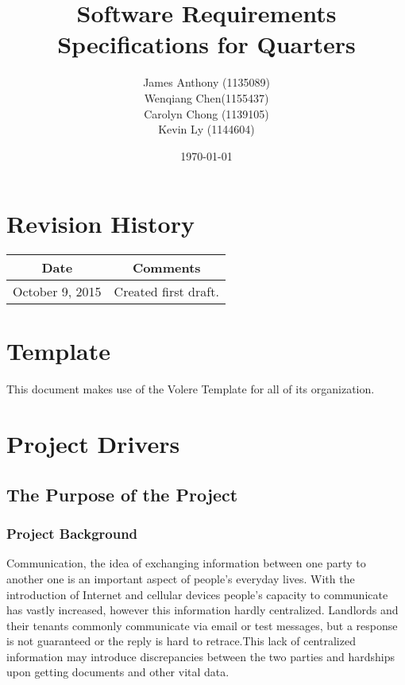\documentclass[12pt, titlepage]{article}
\begin{document}
\title{Software Requirements Specifications for Quarters} 
\author{James Anthony (1135089)\\ Wenqiang Chen(1155437)\\ Carolyn Chong (1139105)\\ Kevin Ly (1144604)}
\date{\today}
\maketitle

\tableofcontents 
\listoffigures
\listoftables

\section*{Revision History}
\begin{tabular}{|c|c|}
\hline
\textbf{Date}  & \textbf{Comments} \\ \hline
October 9, 2015 & Created first draft. \\ 
\hline
\end{tabular}

\section*{Template}
This document makes use of the Volere Template for all of its organization.

\pagebreak

\section{Project Drivers}
\subsection{The Purpose of the Project}
\subsubsection{Project Background}
Communication, the idea of exchanging information between one party to another 
one is an important aspect of people's everyday lives. With the introduction 
of Internet and cellular devices people's capacity to communicate has vastly 
increased, however this information hardly centralized. Landlords and their 
tenants commonly communicate via email or test messages, but a response is not 
guaranteed or the reply is hard to retrace.This lack of centralized 
information may introduce discrepancies between the two parties and hardships 
upon getting documents and other vital data.
\end{document}
